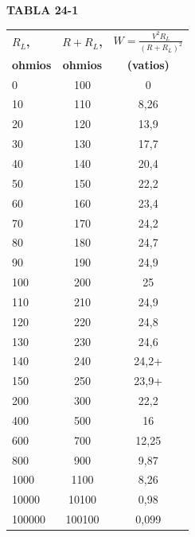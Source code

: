 \documentclass[12pt]{article}
\begin{document}

\vspace{0.5cm}
\begin{center}
    \textbf{TABLA 24-1}
\end{center}

\begin{center}
\begin{tabular}{l S[table-format=6.0] S[table-format=5.2]}
    \toprule
    \textbf{$R_L$,} & \textbf{$R+R_L$,} & {\textbf{$W = \frac{V^2 R_L}{(R+R_L)^2}$}} \\
    \textbf{ohmios} & \textbf{ohmios} & \textbf{(vatios)} \\
     & 100 & 0 \\
    10 & 110 & 8,26 \\
    20 & 120 & 13,9 \\
    30 & 130 & 17,7 \\
    40 & 140 & 20,4 \\
    50 & 150 & 22,2 \\
    60 & 160 & 23,4 \\
    70 & 170 & 24,2 \\
    80 & 180 & 24,7 \\
    90 & 190 & 24,9 \\
    100 & 200 & 25 \\
    110 & 210 & 24,9 \\
    120 & 220 & 24,8 \\
    130 & 230 & 24,6 \\
    140 & 240 & {24,2+} \\
    150 & 250 & {23,9+} \\
    200 & 300 & 22,2 \\
    400 & 500 & 16 \\
    600 & 700 & 12,25 \\
    800 & 900 & 9,87 \\
    1000 & 1100 & 8,26 \\
    10000 & 10100 & 0,98 \\
    100000 & 100100 & 0,099 \\
    \bottomrule
\end{tabular}
\end{center}
\end{document}
